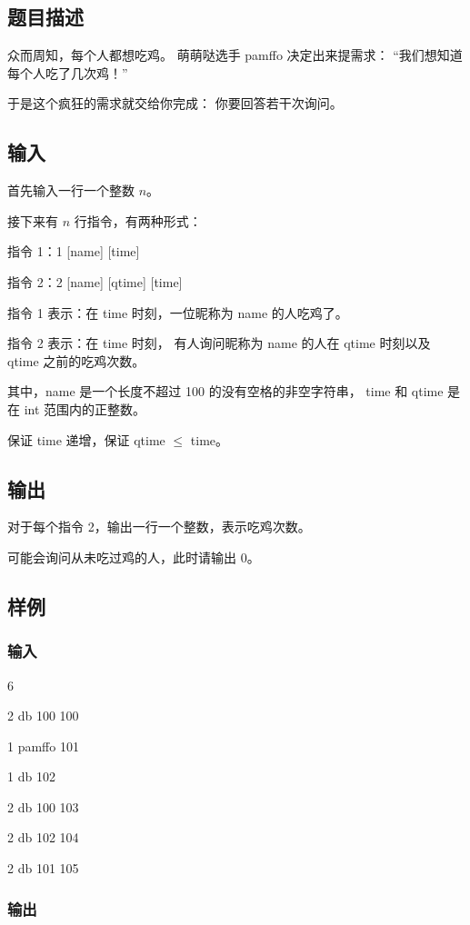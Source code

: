 \documentclass[UTF8]{article}
\begin{document}
	\subsection{题目描述}
	众而周知，每个人都想吃鸡。
	萌萌哒选手 pamffo 决定出来提需求：
	“我们想知道每个人吃了几次鸡！”

	于是这个疯狂的需求就交给你完成：
	你要回答若干次询问。

	\subsection{输入}
	首先输入一行一个整数 $n$。

	接下来有 $n$ 行指令，有两种形式：

	\qquad 指令 1：1 [name] [time]

	\qquad 指令 2：2 [name] [qtime] [time]

	指令 1 表示：在 time 时刻，一位昵称为 name 的人吃鸡了。

	指令 2 表示：在 time 时刻，
	有人询问昵称为 name 的人在 qtime 时刻以及 qtime 之前的吃鸡次数。

	\bigskip
	其中，name 是一个长度不超过 100 的没有空格的非空字符串，
	time 和 qtime 是在 int 范围内的正整数。

	保证 time 递增，保证 qtime $\le$ time。

	\subsection{输出}
	对于每个指令 2，输出一行一个整数，表示吃鸡次数。

	可能会询问从未吃过鸡的人，此时请输出 0。

	\subsection{样例}
	
	\subsubsection{输入}

	6

	2 db 100 100

	1 pamffo 101

	1 db 102

	2 db 100 103

	2 db 102 104

	2 db 101 105

	\subsubsection{输出}
\end{document}
